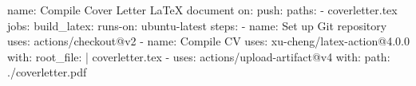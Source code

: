 
name: Compile Cover Letter LaTeX document
on:
  push:
    paths:
      - coverletter.tex
jobs:
  build_latex:
    runs-on: ubuntu-latest
    steps:
      - name: Set up Git repository
        uses: actions/checkout@v2
      - name: Compile CV
        uses: xu-cheng/latex-action@4.0.0
        with:
          root_file: |
            coverletter.tex
      - uses: actions/upload-artifact@v4
        with:
          path: ./coverletter.pdf
